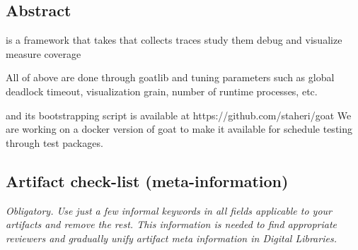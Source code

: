 

\subsection{Abstract}

\goat is a framework that takes that
collects traces
study them
debug and visualize
measure coverage

All of above are done through goatlib and tuning parameters such as global deadlock timeout, visualization grain, number of runtime processes, etc.

\goat and its bootstrapping script is available at https://github.com/staheri/goat
We are working on a docker version of goat to make it available for schedule testing through test packages.

\subsection{Artifact check-list (meta-information)}

{\em Obligatory. Use just a few informal keywords in all fields applicable to your artifacts
and remove the rest. This information is needed to find appropriate reviewers and gradually
unify artifact meta information in Digital Libraries.}

